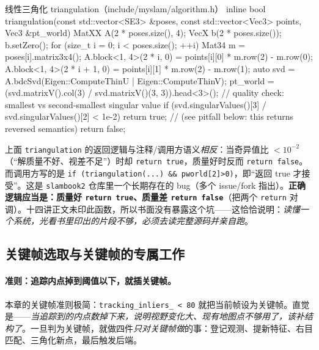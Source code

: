 \begin{codebox}[C++]{线性三角化 triangulation（include/myslam/algorithm.h）}
inline bool triangulation(const std::vector<SE3> &poses,
                          const std::vector<Vec3> points, Vec3 &pt_world) {
    MatXX A(2 * poses.size(), 4);
    VecX b(2 * poses.size());  b.setZero();
    for (size_t i = 0; i < poses.size(); ++i) {
        Mat34 m = poses[i].matrix3x4();
        A.block<1, 4>(2 * i, 0)     = points[i][0] * m.row(2) - m.row(0);
        A.block<1, 4>(2 * i + 1, 0) = points[i][1] * m.row(2) - m.row(1);
    }
    auto svd = A.bdcSvd(Eigen::ComputeThinU | Eigen::ComputeThinV);
    pt_world = (svd.matrixV().col(3) / svd.matrixV()(3, 3)).head<3>();
    // quality check: smallest vs second-smallest singular value
    if (svd.singularValues()[3] / svd.singularValues()[2] < 1e-2)
        return true;        // (see pitfall below: this returns reversed semantics)
    return false;
}
\end{codebox}

\begin{pitfall}
上面 \texttt{triangulation} 的返回逻辑与注释/调用方语义\emph{相反}：当奇异值比 $<10^{-2}$（“解质量不好、视差不足”）时却 \verb|return true|，质量好时反而 \verb|return false|。而调用方写的是 \verb|if (triangulation(...) && pworld[2]>0)|，即“返回 true 才接受”。这是 \texttt{slambook2} 仓库里一个长期存在的 bug（多个 issue/fork 指出）。\textbf{正确逻辑应当是：质量好 \texttt{return true}、质量差 \texttt{return false}}（把两个 \texttt{return} 对调）。十四讲正文未印此函数，所以书面没有暴露这个坑——这恰恰说明：\emph{读懂一个系统，光看书里印出的片段不够，必须去读完整源码并亲自跑}。
\end{pitfall}

\subsection{关键帧选取与关键帧的专属工作}
\label{sec:sys-keyframe}

\paragraph{准则：追踪内点掉到阈值以下，就插关键帧。}
本章的关键帧准则极简：\texttt{tracking\_inliers\_ < 80} 就把当前帧设为关键帧。直觉是——\emph{当追踪到的内点数掉下来，说明视野变化大、现有地图点不够用了，该补结构了}。一旦判为关键帧，就做四件\emph{只对关键帧做}的事：登记观测、提新特征、右目匹配、三角化新点，最后触发后端。

